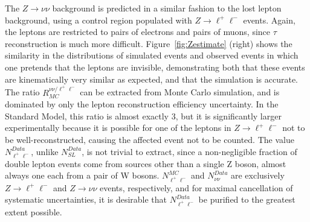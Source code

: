     The $Z\rightarrow \nu\nu$ background is predicted in a similar fashion to the lost lepton background, using a control region populated with $Z\rightarrow \ell^+\ell^-$ events.
    Again, the leptons are restricted to pairs of electrons and pairs of muons, since $\tau$ reconstruction is much more difficult.    
    Figure~\ref{fig:Zestimate} (right) shows the similarity in the \mttwo distributions of simulated \znunu events and observed \zll events in which one pretends that the leptons are invisible, demonstrating both that these events are kinematically very similar as expected, and that the simulation is accurate.
    The ratio $R_{MC}^{\nu\nu/\ell^+\ell^-}$ can be extracted from Monte Carlo simulation, and is dominated by only the lepton reconstruction efficiency uncertainty.
    In the Standard Model, this ratio is almost exactly 3, but it is significantly larger experimentally because it is possible for one of the leptons in $Z\rightarrow\ell^+\ell^-$ not to be well-reconstructed, causing the affected event not to be counted.
    The value $N_{\ell^+\ell^-}^{Data}$, unlike $N_{SL}^{Data}$, is not trivial to extract, since a non-negligible fraction of double lepton events come from sources other than a single Z boson, 
    almost always one each from a pair of W bosons.
    $N_{\ell^+\ell^-}^{MC}$ and $N_{\nu\nu}^{Data}$ are exclusively $Z\rightarrow \ell^+\ell^-$ and $Z\rightarrow\nu\nu$ events, respectively, and for maximal cancellation of systematic uncertainties, it is desirable that $N_{\ell^+\ell^-}^{Data}$ be purified to the greatest extent possible.

